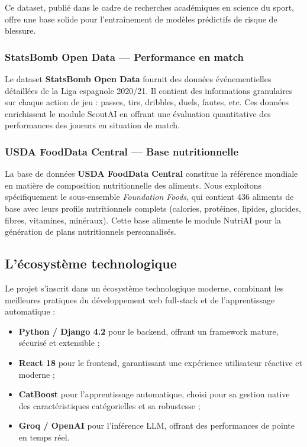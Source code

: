 Ce dataset, publié dans le cadre de recherches académiques en science du sport, offre une base solide pour l'entraînement de modèles prédictifs de risque de blessure.

\subsubsection{StatsBomb Open Data — Performance en match}

Le dataset \textbf{StatsBomb Open Data} \cite{statsbomb} fournit des données événementielles détaillées de la Liga espagnole 2020/21. Il contient des informations granulaires sur chaque action de jeu : passes, tirs, dribbles, duels, fautes, etc. Ces données enrichissent le module ScoutAI en offrant une évaluation quantitative des performances des joueurs en situation de match.

\subsubsection{USDA FoodData Central — Base nutritionnelle}

La base de données \textbf{USDA FoodData Central} \cite{usdafooddata} constitue la référence mondiale en matière de composition nutritionnelle des aliments. Nous exploitons spécifiquement le sous-ensemble \textit{Foundation Foods}, qui contient 436 aliments de base avec leurs profils nutritionnels complets (calories, protéines, lipides, glucides, fibres, vitamines, minéraux). Cette base alimente le module NutriAI pour la génération de plans nutritionnels personnalisés.

\subsection{L'écosystème technologique}

Le projet s'inscrit dans un écosystème technologique moderne, combinant les meilleures pratiques du développement web full-stack et de l'apprentissage automatique :

\begin{itemize}
    \item \textbf{Python / Django 4.2} pour le backend, offrant un framework mature, sécurisé et extensible ;
    \item \textbf{React 18} pour le frontend, garantissant une expérience utilisateur réactive et moderne ;
    \item \textbf{CatBoost} pour l'apprentissage automatique, choisi pour sa gestion native des caractéristiques catégorielles et sa robustesse ;
    \item \textbf{Groq / OpenAI} pour l'inférence LLM, offrant des performances de pointe en temps réel.
\end{itemize}


